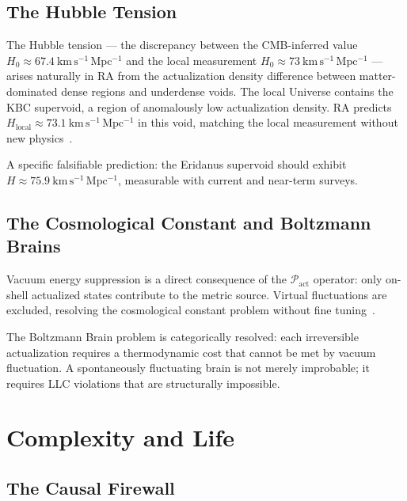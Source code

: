 \documentclass[11pt,a4paper]{article}
\newcommand{\Pact}{\mathcal{P}_{\mathrm{act}}}
\begin{document}
\subsection{The Hubble Tension}

The Hubble tension --- the discrepancy between the CMB-inferred value
$H_0 \approx 67.4~\mathrm{km\,s^{-1}\,Mpc^{-1}}$ and the local
measurement $H_0 \approx 73~\mathrm{km\,s^{-1}\,Mpc^{-1}}$ --- arises
naturally in RA from the actualization density difference between
matter-dominated dense regions and underdense voids. The local Universe
contains the KBC supervoid, a region of anomalously low actualization
density. RA predicts $H_{\mathrm{local}} \approx 73.1~\mathrm{km\,s^{-1}
\,Mpc^{-1}}$ in this void, matching the local measurement without
new physics~\citep{Sandeman2026RAGC, Sandeman2026RADM}.

A specific falsifiable prediction: the Eridanus supervoid should exhibit
$H \approx 75.9~\mathrm{km\,s^{-1}\,Mpc^{-1}}$, measurable with current
and near-term surveys.

\subsection{The Cosmological Constant and Boltzmann Brains}

Vacuum energy suppression is a direct consequence of the $\Pact$
operator: only on-shell actualized states contribute to the metric source.
Virtual fluctuations are excluded, resolving the cosmological constant
problem without fine tuning~\citep{Sandeman2026RAGC}.

The Boltzmann Brain problem is categorically resolved: each irreversible
actualization requires a thermodynamic cost that cannot be met by vacuum
fluctuation. A spontaneously fluctuating brain is not merely improbable;
it requires LLC violations that are structurally impossible.

\section{Complexity and Life}
\label{sec:complexity}

\subsection{The Causal Firewall}
\end{document}
